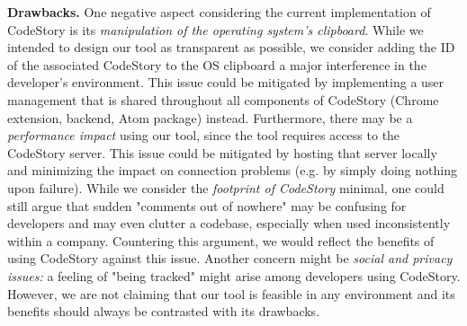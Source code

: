 \documentclass[../manifest.tex]{subfiles}
\begin{document}
\textbf{Drawbacks.}
One negative aspect considering the current implementation of CodeStory is its \textit{manipulation of the operating system's clipboard}. While we intended to design our tool as transparent as possible, we consider adding the ID of the associated CodeStory to the OS clipboard a major interference in the developer's environment. This issue could be mitigated by implementing a user management that is shared throughout all components of CodeStory (Chrome extension, backend, Atom package) instead. Furthermore, there may be a \textit{performance impact} using our tool, since the tool requires access to the CodeStory server. This issue could be mitigated by hosting that server locally and minimizing the impact on connection problems (e.g. by simply doing nothing upon failure). While we consider the \textit{footprint of CodeStory} minimal, one could still argue that sudden "comments out of nowhere" may be confusing for developers and may even clutter a codebase, especially when used inconsistently within a company. Countering this argument, we would reflect the benefits of using CodeStory against this issue. Another concern might be \textit{social and privacy issues:} a feeling of "being tracked" might arise among developers using CodeStory. However, we are not claiming that our tool is feasible in any environment and its benefits should always be contrasted with its drawbacks.
 










\end{document}
